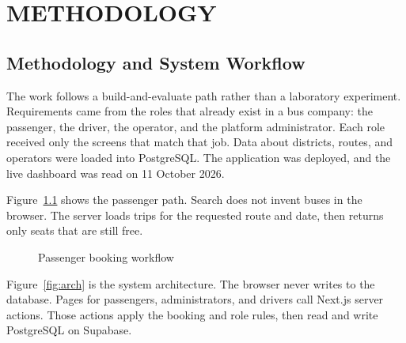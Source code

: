 \documentclass[12pt,a4paper]{report}
\begin{document}
\chapter{METHODOLOGY}
\label{ch:method}

\section{Methodology and System Workflow}
The work follows a build-and-evaluate path rather than a laboratory experiment. Requirements came from the roles that already exist in a bus company: the passenger, the driver, the operator, and the platform administrator. Each role received only the screens that match that job. Data about districts, routes, and operators were loaded into PostgreSQL. The application was deployed, and the live dashboard was read on 11 October 2026.

Figure~\ref{fig:flow} shows the passenger path. Search does not invent buses in the browser. The server loads trips for the requested route and date, then returns only seats that are still free.

\begin{figure}[ht]
\centering
{}
\caption{Passenger booking workflow}
\label{fig:flow}
\end{figure}

Figure~\ref{fig:arch} is the system architecture. The browser never writes to the database. Pages for passengers, administrators, and drivers call Next.js server actions. Those actions apply the booking and role rules, then read and write PostgreSQL on Supabase.
\end{document}

